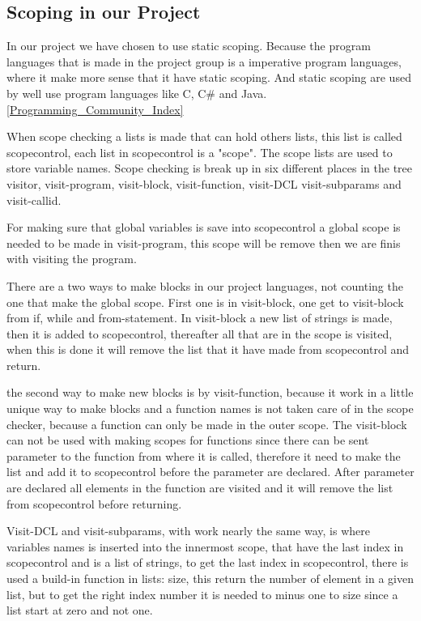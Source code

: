 \subsection{Scoping in our Project}
In our project we have chosen to use static scoping. Because the program languages that is made in the project group is a imperative program languages, where it make more sense that it have static scoping. And static scoping are used by well use program languages like C, C# and Java. \ref{Programming_Community_Index}

When scope checking a lists is made that can hold others lists, this list is called scopecontrol, each list in scopecontrol is a "scope". The scope lists are used to store variable names. Scope checking is break up in six different places in the tree visitor, visit-program, visit-block, visit-function, visit-DCL visit-subparams and visit-callid.

For making sure that global variables is save into scopecontrol a global scope is needed to be made in visit-program, this scope will be remove then we are finis with visiting the program.

There are a two ways to make blocks in our project languages, not counting the one that make the global scope. First one is in visit-block, one get to visit-block from if, while and from-statement. In visit-block a new list of strings is made, then it is added to scopecontrol, thereafter all that are in the scope is visited, when this is done it will remove the list that it have made from scopecontrol and return.

the second way to make new blocks is by visit-function, because it work in a little unique way to make blocks and a function names is not taken care of in the scope checker, because a function can only be made in the outer scope. The visit-block can not be used with making scopes for functions since there can be sent parameter to the function from where it is called, therefore it need to make the list and add it to scopecontrol before the parameter are declared. After parameter are declared all elements in the function are visited and it will remove the list from scopecontrol before returning.

Visit-DCL and visit-subparams, with work nearly the same way, is where variables names is inserted into the innermost scope, that have the last index in scopecontrol and is a list of strings, to get the last index in scopecontrol, there is used a build-in function in lists: size, this return the number of element in a given list, but to get the right index number it is needed to minus one to size since a list start at zero and not one.

